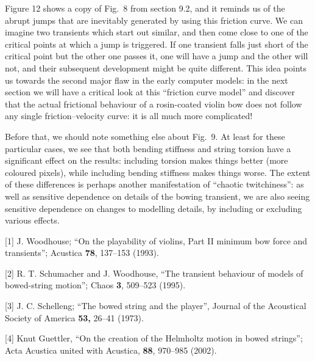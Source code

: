   Figure 12 shows a copy of Fig.\ 8 from section 9.2, and it reminds us of the 
  abrupt jumps that are inevitably generated by using this friction curve. We 
  can imagine two transients which start out similar, and then come close to 
  one of the critical points at which a jump is triggered. If one transient 
  falls just short of the critical point but the other one passes it, one will 
  have a jump and the other will not, and their subsequent development might be 
  quite different. This idea points us towards the second major flaw in the 
  early computer models: in the next section we will have a critical look at 
  this “friction curve model” and discover that the actual frictional behaviour 
  of a rosin-coated violin bow does not follow any single friction--velocity 
  curve: it is all much more complicated! 


  Before that, we should note something else about Fig.\ 9. At least for these 
  particular cases, we see that both bending stiffness and string torsion have 
  a significant effect on the results: including torsion makes things better 
  (more coloured pixels), while including bending stiffness makes things worse. 
  The extent of these differences is perhaps another manifestation of “chaotic 
  twitchiness”: as well as sensitive dependence on details of the bowing 
  transient, we are also seeing sensitive dependence on changes to modelling 
  details, by including or excluding various effects. 



  \sectionreferences{}[1] J. Woodhouse; ``On the playability of violins, Part 
  II minimum bow force and transients''; Acustica \textbf{78}, 137--153 (1993). 

  [2] R. T. Schumacher and J. Woodhouse, ``The transient behaviour of models of 
  bowed-string motion''; Chaos \textbf{3}, 509--523 (1995). 

  [3] J. C. Schelleng; ``The bowed string and the player'', Journal of the 
  Acoustical Society of America \textbf{53, }26–41 (1973). 

  [4] Knut Guettler, ``On the creation of the Helmholtz motion in bowed 
  strings''; Acta Acustica united with Acustica, \textbf{88}, 970--985 (2002). 

